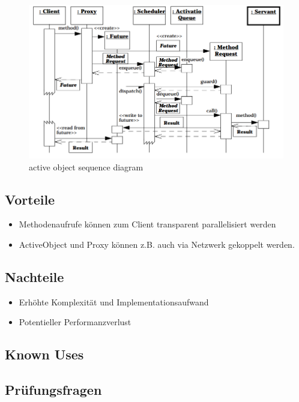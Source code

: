 \begin{figure}[H]
	\centering
	\includegraphics[width=\textwidth]{content/posa2/active-object/images/act-obj_sequence-diagram.png}
	\caption{active object sequence diagram}
\end{figure}




\subsection{Vorteile}


\begin{itemize}
	\item Methodenaufrufe können zum Client transparent parallelisiert werden
	\item ActiveObject und Proxy können z.B. auch via Netzwerk gekoppelt werden.
\end{itemize}

\subsection{Nachteile}


\begin{itemize}
	\item Erhöhte Komplexität und Implementationsaufwand
	\item Potentieller Performanzverlust
\end{itemize}

\subsection{Known Uses}


\subsection{Prüfungsfragen}


